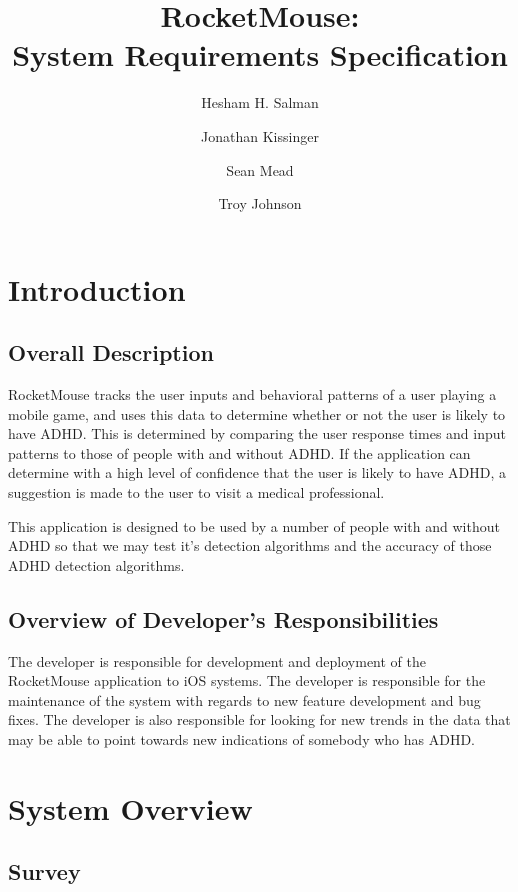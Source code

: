 \documentclass[a4wide]{article}
\title{RocketMouse:\\ System Requirements Specification}
\author{Hesham H. Salman \and Jonathan Kissinger \and Sean Mead
\and Troy Johnson}
\begin{document}
\maketitle

\section{Introduction}

\subsection{Overall Description}
\indent RocketMouse tracks the user inputs and behavioral patterns of a user playing a mobile game, and uses this data to
determine whether or not the user is likely to have ADHD. This is determined by
comparing the user response times and input patterns to those of people with and
without ADHD. If the application can determine with a high level of confidence
that the user is likely to have ADHD, a suggestion is made to the user to visit
a medical professional. \par
This application is designed to be used by a number of people with and without ADHD so that we may test it's detection algorithms and the accuracy of those ADHD detection algorithms.


\subsection{Overview of Developer's Responsibilities}

The developer is responsible for development and deployment of the RocketMouse
application to iOS systems. The developer is responsible for the maintenance
of the system with regards to new feature development and bug fixes. The developer is also responsible for looking for new trends in the data that may be able to point towards new indications of somebody who has ADHD.


\section{System Overview}

\subsection{Survey}
\end{document}
